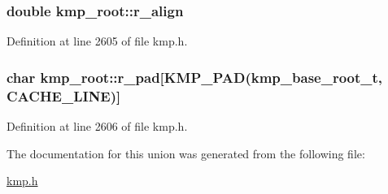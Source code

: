 \hypertarget{unionkmp__root_ad50eea87a73ed278159ae5553d5e722e}{
\subsubsection[{r\-\_\-align}]{\setlength{\rightskip}{0pt plus 5cm}double kmp\-\_\-root\-::r\-\_\-align}}\label{unionkmp__root_ad50eea87a73ed278159ae5553d5e722e}


Definition at line 2605 of file kmp.\-h.

\hypertarget{unionkmp__root_a045325ef1bf14a5e91b20236dd26227d}{
\subsubsection[{r\-\_\-pad}]{\setlength{\rightskip}{0pt plus 5cm}char kmp\-\_\-root\-::r\-\_\-pad\mbox{[}{\bf K\-M\-P\-\_\-\-P\-A\-D}({\bf kmp\-\_\-base\-\_\-root\-\_\-t}, {\bf C\-A\-C\-H\-E\-\_\-\-L\-I\-N\-E})\mbox{]}}}\label{unionkmp__root_a045325ef1bf14a5e91b20236dd26227d}


Definition at line 2606 of file kmp.\-h.



The documentation for this union was generated from the following file\-:\begin{DoxyCompactItemize}
\item 
\hyperlink{kmp_8h}{kmp.\-h}\end{DoxyCompactItemize}

